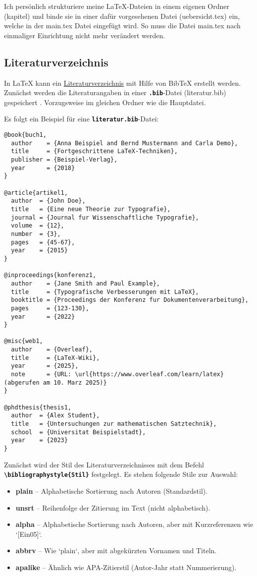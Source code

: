 Ich persönlich strukturiere meine \LaTeX{}-Dateien in einem eigenen Ordner (kapitel) und binde sie in einer dafür vorgesehenen Datei (uebersicht.tex) ein, welche in der main.tex Datei eingefügt wird. So muss die Datei main.tex nach einmaliger Einrichtung nicht mehr verändert werden.


\subsection{Literaturverzeichnis}
\label{sec:literaturverzeichnis_erklärung}
In \LaTeX{} kann ein \hyperref[sec:literaturverzeichnis]{Literaturverzeichnis} mit Hilfe von BibTeX erstellt werden.
Zunächst werden die Literaturangaben in einer \textbf{\texttt{.bib}}-Datei (literatur.bib) gespeichert . Vorzugsweise im gleichen Ordner wie die Hauptdatei.

Es folgt ein Beispiel für eine \textbf{\texttt{literatur.bib}}-Datei:

\begin{lstlisting}[language={[LaTeX]TeX}, caption={Beispiel für eine \texttt{.bib}-Datei}]
@book{buch1,
  author    = {Anna Beispiel and Bernd Mustermann and Carla Demo},
  title     = {Fortgeschrittene LaTeX-Techniken},
  publisher = {Beispiel-Verlag},
  year      = {2018}
}

@article{artikel1,
  author  = {John Doe},
  title   = {Eine neue Theorie zur Typografie},
  journal = {Journal fur Wissenschaftliche Typografie},
  volume  = {12},
  number  = {3},
  pages   = {45-67},
  year    = {2015}
}

@inproceedings{konferenz1,
  author    = {Jane Smith and Paul Example},
  title     = {Typografische Verbesserungen mit LaTeX},
  booktitle = {Proceedings der Konferenz fur Dokumentenverarbeitung},
  pages     = {123-130},
  year      = {2022}
}

@misc{web1,
  author    = {Overleaf},
  title     = {LaTeX-Wiki},
  year      = {2025},
  note      = {URL: \url{https://www.overleaf.com/learn/latex} (abgerufen am 10. Marz 2025)}
}

@phdthesis{thesis1,
  author  = {Alex Student},
  title   = {Untersuchungen zur mathematischen Satztechnik},
  school  = {Universitat Beispielstadt},
  year    = {2023}
}
\end{lstlisting}

Zunächst wird der Stil des Literaturverzeichnisses mit dem Befehl \textbf{\texttt{\textbackslash bibliographystyle\{Stil\}}} festgelegt.
Es stehen folgende Stile zur Auswahl:
\begin{itemize}
  \item \textbf{plain} – Alphabetische Sortierung nach Autoren (Standardstil).
  \item \textbf{unsrt} – Reihenfolge der Zitierung im Text (nicht alphabetisch).
  \item \textbf{alpha} – Alphabetische Sortierung nach Autoren, aber mit Kurzreferenzen wie `[Ein05]`.
  \item \textbf{abbrv} – Wie `plain`, aber mit abgekürzten Vornamen und Titeln.
  \item \textbf{apalike} – Ähnlich wie APA-Zitierstil (Autor-Jahr statt Nummerierung).
\end{itemize}

